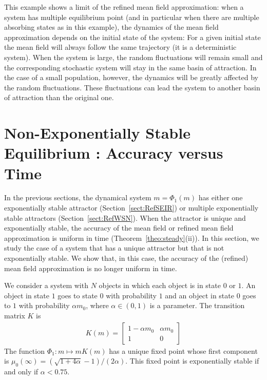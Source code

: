 \documentclass{elsarticle}
\begin{document}
This example shows a limit of the refined mean field approximation:
when a system has multiple equilibrium point (and in particular when
there are multiple absorbing states as in this example), the dynamics
of the mean field approximation depends on the initial state of the
system: For a given initial state the mean field will always follow
the same trajectory (it is a deterministic system). When the system is
large, the random fluctuations will remain small and the corresponding
stochastic system will stay in the same basin of attraction.  In the
case of a small population, however, the dynamics will be greatly
affected by the random fluctuations. These fluctuations can lead the
system to another basin of attraction than the original one.


\section{Non-Exponentially Stable Equilibrium : Accuracy versus Time}
\label{sect:non-exponentially-stable}

In the previous sections, the dynamical system $m=\Phi_1(m)$ has
either one exponentially stable attractor (Section~\ref{sect:RefSEIR})
or multiple exponentially stable attractors
(Section~\ref{sect:RefWSN}).  When the attractor is unique and
exponentially stable, the accuracy of the mean field or refined mean
field approximation is uniform in time
(Theorem~\ref{theo:steady}(ii)).  In this section, we study the case
of a system that has a unique attractor but that is not exponentially
stable.  We show that, in this case, the accuracy of the (refined)
mean field approximation is no longer uniform in time.


We consider a system with $N$ objects in which each object is in state
$0$ or $1$. An object in state $1$ goes to state $0$ with probability
$1$ and an object in state $0$ goes to $1$ with probability
$\alpha m_0$, where $\alpha\in(0,1)$ is a parameter. The transition
matrix $K$ is
\begin{align*}
  K(m) = \left[
  \begin{array}{cc}
    1-\alpha m_0&\alpha m_0\\
    1 & 0
  \end{array}
\right]
\end{align*}
The function $\Phi_1:m\mapsto mK(m)$ has a unique fixed point whose
first component is
$\mu_0(\infty)=(\sqrt{1+4\alpha}-1)/(2\alpha)$. This fixed point is
exponentially stable if and only if $\alpha < 0.75$.
\end{document}
